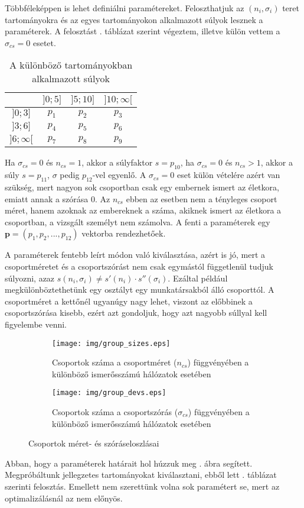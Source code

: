 \documentclass[12pt]{article}
\begin{document}
Többféleképpen is lehet definiálni paramétereket. Feloszthatjuk az $(n_i, \sigma_i)$ teret \iffalse TODO: vagy mit \fi tartományokra és az egyes tartományokon alkalmazott súlyok lesznek a paraméterek. A felosztást . táblázat szerint végeztem, illetve külön vettem a $\sigma_{cs} = 0$ esetet. %
\begin{table}[H]
	\centering
	\begin{tabular}{|c|c|c|c|}
		\hline
		\diagbox{$\sigma_{cs}$}{$n_{cs}$} & $]0;5]$ & $]5;10]$ & $]10;\infty[$  \\
		\hline
		$]0;3]$ & $p_1$ & $p_2$ & $p_3$ \\
		\hline
		$]3;6]$ & $p_4$ & $p_5$ & $p_6$ \\
		\hline
		$]6;\infty[$  & $p_7$ & $p_8$ & $p_9$ \\
		\hline
	\end{tabular}
	\caption{A különböző tartományokban alkalmazott súlyok}
	\label{felosztas}
\end{table}
\noindent
Ha $\sigma_{cs} = 0$ és $n_{cs} = 1$, akkor a súlyfaktor $s = p_{10}$, ha $\sigma_{cs} = 0$ és $n_{cs} > 1$, akkor a súly $s = p_{11}$, $\sigma$ pedig $p_{12}$-vel egyenlő. A $\sigma_{cs} = 0$ eset külön vételére azért van szükség, mert nagyon sok csoportban csak egy embernek ismert az életkora, emiatt annak a szórása $0$. Az $n_{cs}$ ebben az esetben nem a tényleges csoport méret, hanem azoknak az embereknek a száma, akiknek ismert az életkora a csoportban, a vizsgált személyt nem számolva.
A fenti a paraméterek egy $\mathbf{p} = (p_1, p_2, ..., p_{12})$ vektorba rendezhetőek.

A paraméterek fentebb leírt módon való kiválasztása, azért is jó, mert a csoportméretet és a csoportszórást nem csak egymástól függetlenül tudjuk súlyozni, azaz $s(n_i, \sigma_i) \neq s'(n_i)\cdot s''(\sigma_i)$. Ezáltal például megkülönböztethetünk egy osztályt egy munkatársakból álló csoporttól. A csoportméret a kettőnél ugyanúgy nagy lehet, viszont az előbbinek a csoportszórása kisebb, ezért azt gondoljuk, hogy azt nagyobb súllyal kell figyelembe venni.
\begin{figure}[H]
	\centering
	\begin{subfigure}{0.49\textwidth}
		\texttt{[image: img/group\_sizes.eps]}
		\caption{Csoportok száma a csoportméret ($n_{cs}$) függvényében a különböző ismerősszámú hálózatok esetében}
	\end{subfigure} \hfill
	\begin{subfigure}{0.49\textwidth}
		\texttt{[image: img/group\_devs.eps]}
		\caption{Csoportok száma a csoportszórás ($\sigma_{cs}$) függvényében a különböző ismerősszámú hálózatok esetében}
	\end{subfigure}
	\caption{Csoportok méret- és szóráseloszlásai}
	\label{meret_szoras_eloszlas}
\end{figure}
Abban, hogy a paraméterek határait hol húzzuk meg . ábra segített. Megpróbáltunk jellegzetes tartományokat kiválasztani, ebből lett . táblázat szerinti felosztás. Emellett nem szerettünk volna sok paramétert se, mert az optimalizálásnál az nem előnyös. 
\end{document}
